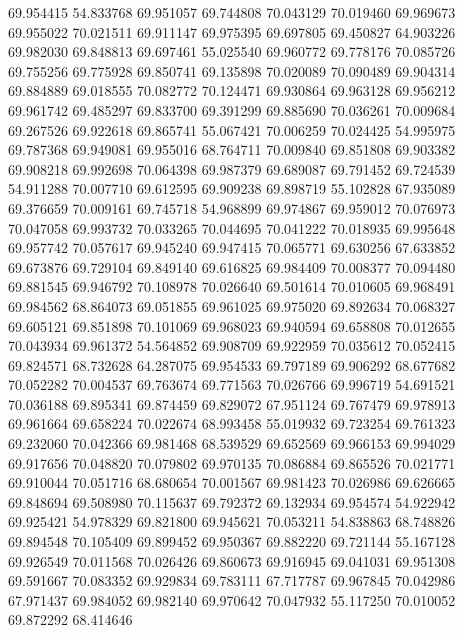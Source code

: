 69.954415
54.833768
69.951057
69.744808
70.043129
70.019460
69.969673
69.955022
70.021511
69.911147
69.975395
69.697805
69.450827
64.903226
69.982030
69.848813
69.697461
55.025540
69.960772
69.778176
70.085726
69.755256
69.775928
69.850741
69.135898
70.020089
70.090489
69.904314
69.884889
69.018555
70.082772
70.124471
69.930864
69.963128
69.956212
69.961742
69.485297
69.833700
69.391299
69.885690
70.036261
70.009684
69.267526
69.922618
69.865741
55.067421
70.006259
70.024425
54.995975
69.787368
69.949081
69.955016
68.764711
70.009840
69.851808
69.903382
69.908218
69.992698
70.064398
69.987379
69.689087
69.791452
69.724539
54.911288
70.007710
69.612595
69.909238
69.898719
55.102828
67.935089
69.376659
70.009161
69.745718
54.968899
69.974867
69.959012
70.076973
70.047058
69.993732
70.033265
70.044695
70.041222
70.018935
69.995648
69.957742
70.057617
69.945240
69.947415
70.065771
69.630256
67.633852
69.673876
69.729104
69.849140
69.616825
69.984409
70.008377
70.094480
69.881545
69.946792
70.108978
70.026640
69.501614
70.010605
69.968491
69.984562
68.864073
69.051855
69.961025
69.975020
69.892634
70.068327
69.605121
69.851898
70.101069
69.968023
69.940594
69.658808
70.012655
70.043934
69.961372
54.564852
69.908709
69.922959
70.035612
70.052415
69.824571
68.732628
64.287075
69.954533
69.797189
69.906292
68.677682
70.052282
70.004537
69.763674
69.771563
70.026766
69.996719
54.691521
70.036188
69.895341
69.874459
69.829072
67.951124
69.767479
69.978913
69.961664
69.658224
70.022674
68.993458
55.019932
69.723254
69.761323
69.232060
70.042366
69.981468
68.539529
69.652569
69.966153
69.994029
69.917656
70.048820
70.079802
69.970135
70.086884
69.865526
70.021771
69.910044
70.051716
68.680654
70.001567
69.981423
70.026986
69.626665
69.848694
69.508980
70.115637
69.792372
69.132934
69.954574
54.922942
69.925421
54.978329
69.821800
69.945621
70.053211
54.838863
68.748826
69.894548
70.105409
69.899452
69.950367
69.882220
69.721144
55.167128
69.926549
70.011568
70.026426
69.860673
69.916945
69.041031
69.951308
69.591667
70.083352
69.929834
69.783111
67.717787
69.967845
70.042986
67.971437
69.984052
69.982140
69.970642
70.047932
55.117250
70.010052
69.872292
68.414646
